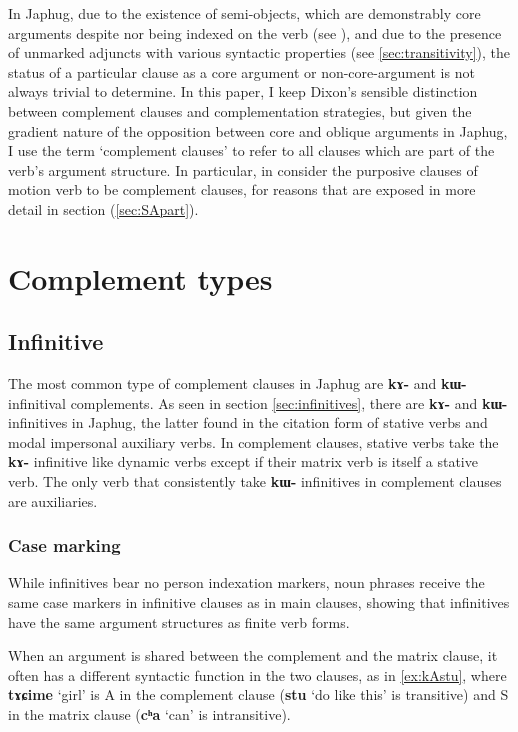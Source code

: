 \documentclass[oldfontcommands,oneside,a4paper,11pt]{article}
\newcommand{\ipa}[1]{\textbf{\phon#1}} %
\newcommand{\jpg}[2]{\ipa{#1} `#2'} %
\begin{document}
In Japhug, due to the existence of semi-objects, which are demonstrably core arguments despite nor being indexed on the verb (see \citet{jacques16relatives}), and due to the presence of unmarked adjuncts with various syntactic properties (see \ref{sec:transitivity}), the status of a particular clause as a core argument or non-core-argument is not always trivial to determine. In this paper, I keep Dixon's sensible distinction between complement clauses and complementation strategies, but given the gradient nature of the opposition between core and oblique arguments in Japhug, I use the term `complement clauses' to refer to all clauses which are part of the verb's argument structure. In particular, in consider the purposive clauses of motion verb to be complement clauses, for reasons that are exposed in more detail in section (\ref{sec:SApart}).
 

\section{Complement types}


\subsection{Infinitive} \label{sec:infinitives.compl}
The most common type of complement clauses in Japhug are \ipa{kɤ-} and \ipa{kɯ-} infinitival complements. As seen in section \ref{sec:infinitives}, there are \ipa{kɤ-} and \ipa{kɯ-} infinitives in Japhug, the latter found in the citation form of stative verbs and modal impersonal auxiliary verbs. In complement clauses, stative verbs take the \ipa{kɤ-} infinitive like dynamic verbs except if their matrix verb is itself a stative verb. The only verb that consistently take \ipa{kɯ-} infinitives in complement clauses are auxiliaries.

\subsubsection{Case marking} \label{sec:case.matrix}
While infinitives bear no person indexation markers, noun phrases receive the same case markers in infinitive clauses as in main clauses, showing that infinitives have the same argument structures as finite verb forms.

When an argument is shared between the complement and the matrix clause, it often has a different syntactic function in the two clauses, as in \ref{ex:kAstu}, where \ipa{tɤɕime} `girl' is A in the complement clause (\jpg{stu}{do like this} is transitive) and S in the matrix clause (\jpg{cʰa}{can} is intransitive). 
\end{document}
